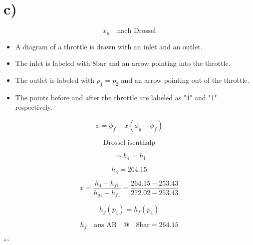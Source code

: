 

\section*{c)}

\[
x_n \quad \text{nach Drossel}
\]

\begin{itemize}
    \item A diagram of a throttle is drawn with an inlet and an outlet.
    \item The inlet is labeled with $8 \text{bar}$ and an arrow pointing into the throttle.
    \item The outlet is labeled with $p_1 = p_2$ and an arrow pointing out of the throttle.
    \item The points before and after the throttle are labeled as "4" and "1" respectively.
\end{itemize}

\[
\phi = \phi_f + x (\phi_g - \phi_f)
\]

\[
\text{Drossel isenthalp}
\]

\[
\Rightarrow h_4 = h_1
\]

\[
h_4 = 264.15
\]

\[
x = \frac{h_4 - h_{f1}}{h_{g1} - h_{f1}} = \frac{264.15 - 253.43}{272.02 - 253.43}
\]

\[
h_g(p_1) = h_f(p_4)
\]

\[
h_f \quad \text{aus AB} \quad @ \quad 8 \text{bar} = 264.15
\]

```